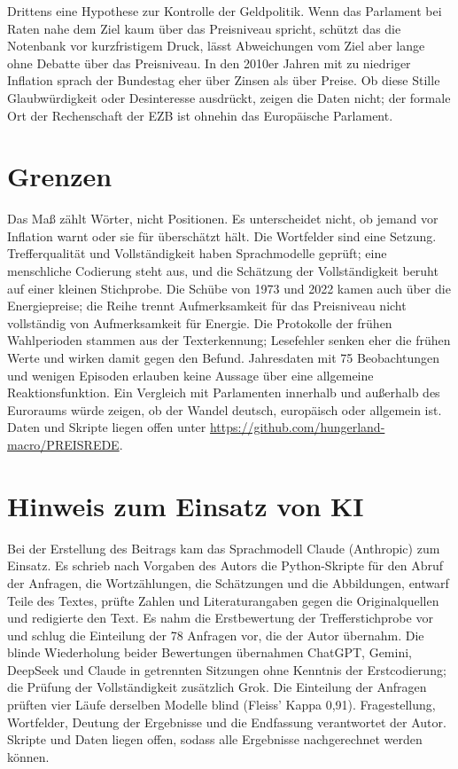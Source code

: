 \documentclass[11pt,a4paper]{article}
\begin{document}
Drittens eine Hypothese zur Kontrolle der Geldpolitik. Wenn das Parlament bei Raten nahe dem Ziel kaum über das Preisniveau spricht, schützt das die Notenbank vor kurzfristigem Druck, lässt Abweichungen vom Ziel aber lange ohne Debatte über das Preisniveau. In den 2010er Jahren mit zu niedriger Inflation sprach der Bundestag eher über Zinsen als über Preise. Ob diese Stille Glaubwürdigkeit oder Desinteresse ausdrückt, zeigen die Daten nicht; der formale Ort der Rechenschaft der EZB ist ohnehin das Europäische Parlament.

\section{Grenzen}

Das Maß zählt Wörter, nicht Positionen. Es unterscheidet nicht, ob jemand vor Inflation warnt oder sie für überschätzt hält. Die Wortfelder sind eine Setzung. Trefferqualität und Vollständigkeit haben Sprachmodelle geprüft; eine menschliche Codierung steht aus, und die Schätzung der Vollständigkeit beruht auf einer kleinen Stichprobe. Die Schübe von 1973 und 2022 kamen auch über die Energiepreise; die Reihe trennt Aufmerksamkeit für das Preisniveau nicht vollständig von Aufmerksamkeit für Energie. Die Protokolle der frühen Wahlperioden stammen aus der Texterkennung; Lesefehler senken eher die frühen Werte und wirken damit gegen den Befund. Jahresdaten mit 75 Beobachtungen und wenigen Episoden erlauben keine Aussage über eine allgemeine Reaktionsfunktion. Ein Vergleich mit Parlamenten innerhalb und außerhalb des Euroraums würde zeigen, ob der Wandel deutsch, europäisch oder allgemein ist. Daten und Skripte liegen offen unter \url{https://github.com/hungerland-macro/PREISREDE}.

\section*{Hinweis zum Einsatz von KI}

Bei der Erstellung des Beitrags kam das Sprachmodell Claude (Anthropic) zum Einsatz. Es schrieb nach Vorgaben des Autors die Python-Skripte für den Abruf der Anfragen, die Wortzählungen, die Schätzungen und die Abbildungen, entwarf Teile des Textes, prüfte Zahlen und Literaturangaben gegen die Originalquellen und redigierte den Text. Es nahm die Erstbewertung der Trefferstichprobe vor und schlug die Einteilung der 78 Anfragen vor, die der Autor übernahm. Die blinde Wiederholung beider Bewertungen übernahmen ChatGPT, Gemini, DeepSeek und Claude in getrennten Sitzungen ohne Kenntnis der Erstcodierung; die Prüfung der Vollständigkeit zusätzlich Grok. Die Einteilung der Anfragen prüften vier Läufe derselben Modelle blind (Fleiss' Kappa 0,91). Fragestellung, Wortfelder, Deutung der Ergebnisse und die Endfassung verantwortet der Autor. Skripte und Daten liegen offen, sodass alle Ergebnisse nachgerechnet werden können.
\end{document}
